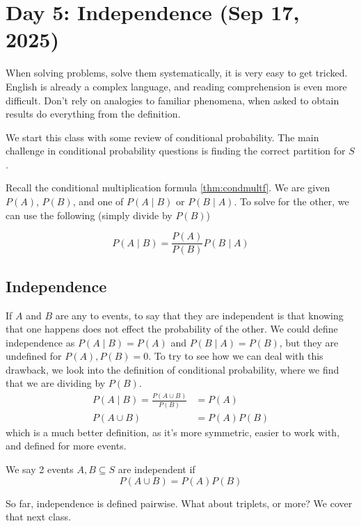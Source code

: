 \section{Day 5: Independence (Sep 17, 2025)}

When solving problems, solve them systematically, it is very easy to get tricked. English is already a complex language, and reading comprehension is even more difficult. Don't rely on analogies to familiar phenomena, when asked to obtain results do everything from the definition.

We start this class with some review of conditional probability. The main challenge in conditional probability questions is finding the correct partition for $S$. 

Recall the conditional multiplication formula \ref{thm:condmultf}. We are given $P(A)$, $P(B)$, and one of $P(A \mid B)$ or $P(B \mid A)$. To solve for the other, we can use the following (simply divide by $P(B)$)

\begin{simplethm}
\[
    P(A \mid B) = \frac{P(A)}{P(B)} P(B \mid A)
\]
\end{simplethm}

\subsection{Independence}
If $A$ and $B$ are any to events, to say that they are independent is that knowing that one happens does not effect the probability of the other. We could define independence as $P(A \mid B) = P(A)$ and $P(B \mid A) = P(B)$, but they are undefined for $P(A), P(B) = 0$. To try to see how we can deal with this drawback, we look into the definition of conditional probability, where we find that we are dividing by $P(B)$.
\begin{align*}
    P(A \mid B) = \frac{P(A \cup B)}{P(B)} &= P(A) \\
    P(A \cup B) &= P(A)P(B)
\end{align*}
which is a much better definition, as it's more symmetric, easier to work with, and defined for more events.
\begin{definition}[Independence]
    We say 2 events $A, B \subseteq S$ are independent if 
    \[
    P(A \cup B) = P(A)P(B)
    \]
\end{definition}

So far, independence is defined pairwise. What about triplets, or more? We cover that next class.
